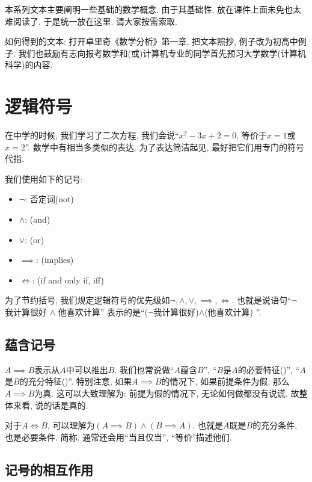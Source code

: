 \documentclass{ctexart}
\begin{document}

本系列文本主要阐明一些基础的数学概念. 由于其基础性, 放在课件上面未免也太难阅读了. 于是统一放在这里. 请大家按需索取. 

如何得到的文本: 打开卓里奇《数学分析》第一章, 把文本照抄, 例子改为初高中例子. 我们也鼓励有志向报考数学和(或)计算机专业的同学首先预习大学数学(计算机科学)的内容.

\section{逻辑符号}

在中学的时候, 我们学习了二次方程. 我们会说``$x^2-3x+2=0$, 等价于$x=1$或$x=2$''. 数学中有相当多类似的表达. 为了表达简洁起见, 最好把它们用专门的符号代指. 

我们使用如下的记号: 

\begin{itemize}
    \item $\lnot$: 否定词(not)
    \item $\land$: (and)
    \item $\lor$: (or)
    \item $\implies$: (implies)
    \item $\iff$: (if and only if, iff)
\end{itemize}



为了节约括号, 我们规定逻辑符号的优先级如$\lnot, \land, \lor, \implies, \iff$. 也就是说语句``$\lnot$ 我计算很好 $\land$ 他喜欢计算''
表示的是``($\lnot$我计算很好)$\land$(他喜欢计算) ''. 


\subsection{蕴含记号} $A\implies B $表示从$A$中可以推出$B$. 我们也常说做``$A$蕴含$B$'', ``$B$是$A$的必要特征()'', ``$A$是$B$的充分特征()''. 特别注意, 如果$A\implies B$的情况下, 如果前提条件为假, 那么$A \implies B$为真. 这可以大致理解为: 前提为假的情况下, 无论如何做都没有说谎, 故整体来看, 说的话是真的.  

对于$A \iff B$, 可以理解为$(A\implies B) \land (B\implies A)$. 也就是$A$既是$B$的充分条件, 也是必要条件. 简称. 通常还会用``当且仅当'', ``等价''描述他们. 


\subsection{记号的相互作用}
\end{document}
